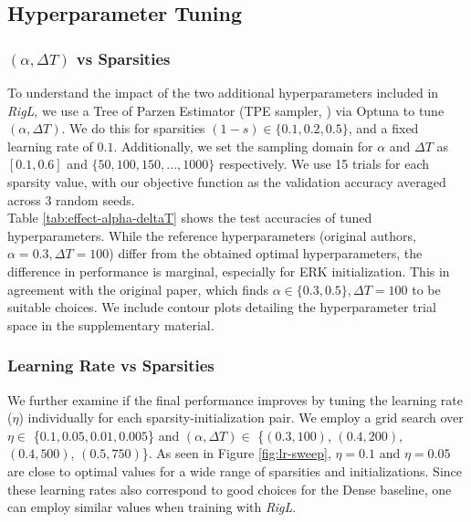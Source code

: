\subsection{Hyperparameter Tuning}\label{hyperparameter-tuning}



\subsubsection{$(\alpha, \Delta T)$ vs Sparsities} To understand the impact of the two additional hyperparameters included in \textit{RigL}, we use a Tree of Parzen Estimator (TPE sampler, \citet{TPE_Bergstra}) via Optuna to tune $(\alpha, \Delta T)$. We do this for sparsities $(1 - s) \in \{0.1,0.2,0.5\}$, and a fixed learning rate of $0.1$. Additionally, we set the sampling domain for $\alpha$ and $\Delta T$ as $[0.1,0.6]$ and $\{50,100, 150,...,1000\}$ respectively. We use 15 trials for each sparsity value, with our objective function as the validation accuracy averaged across 3 random seeds.\\



Table \ref{tab:effect-alpha-deltaT} shows the test accuracies of tuned hyperparameters. While the reference hyperparameters (original authors, $\alpha=0.3, \Delta T=100$) differ from the obtained optimal hyperparameters, the difference in performance is marginal, especially for ERK initialization. This in agreement with the original paper, which finds $\alpha \in \{0.3, 0.5\}, \Delta T = 100$ to be suitable choices. We include contour plots detailing the hyperparameter trial space in the supplementary material.

\subsubsection{Learning Rate vs Sparsities} We further examine if the final performance improves by tuning the learning rate ($\eta$) individually for each sparsity-initialization pair. We employ a grid search over $\eta \in $ \{$0.1,0.05,0.01,0.005$\} and $(\alpha, \Delta T) \in$ \{$(0.3, 100)$, $(0.4,200)$, $(0.4, 500)$, $(0.5, 750)$\}. As seen in Figure \ref{fig:lr-sweep}, $\eta = 0.1$ and $\eta = 0.05$ are close to optimal values for a wide range of sparsities and initializations. Since these learning rates also correspond to good choices for the Dense baseline, one can employ similar values when training with \textit{RigL}.

